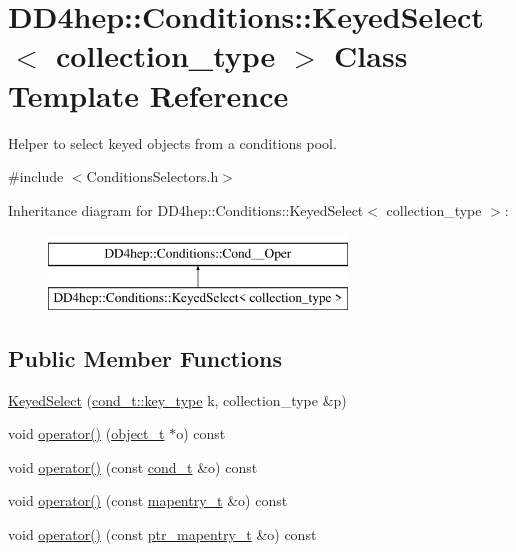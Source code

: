\hypertarget{class_d_d4hep_1_1_conditions_1_1_keyed_select}{}\section{D\+D4hep\+:\+:Conditions\+:\+:Keyed\+Select$<$ collection\+\_\+type $>$ Class Template Reference}
\label{class_d_d4hep_1_1_conditions_1_1_keyed_select}


Helper to select keyed objects from a conditions pool.  




{\ttfamily \#include $<$Conditions\+Selectors.\+h$>$}

Inheritance diagram for D\+D4hep\+:\+:Conditions\+:\+:Keyed\+Select$<$ collection\+\_\+type $>$\+:\begin{figure}[H]
\begin{center}
\leavevmode
\includegraphics[height=2.000000cm]{class_d_d4hep_1_1_conditions_1_1_keyed_select}
\end{center}
\end{figure}
\subsection*{Public Member Functions}
\begin{DoxyCompactItemize}
\item 
\hyperlink{class_d_d4hep_1_1_conditions_1_1_keyed_select_a4158acaaf6c6911619a41d39fe92d247}{Keyed\+Select} (\hyperlink{class_d_d4hep_1_1_conditions_1_1_condition_a7528efa762e8cc072ef80ea67c3531f9}{cond\+\_\+t\+::key\+\_\+type} k, collection\+\_\+type \&p)
\item 
void \hyperlink{class_d_d4hep_1_1_conditions_1_1_keyed_select_afd27ff9c2eb4d46c07ff631eb852da6b}{operator()} (\hyperlink{class_d_d4hep_1_1_conditions_1_1_cond_____oper_a4229491e49bfd21058dff10125a73f63}{object\+\_\+t} $\ast$o) const
\item 
void \hyperlink{class_d_d4hep_1_1_conditions_1_1_keyed_select_a2fb04380265c69a53a38b8b8e991a5f8}{operator()} (const \hyperlink{class_d_d4hep_1_1_conditions_1_1_cond_____oper_aceca9f6a0e8c84364946eace47275d09}{cond\+\_\+t} \&o) const
\item 
void \hyperlink{class_d_d4hep_1_1_conditions_1_1_keyed_select_a5127027cac0e941b11a10c2d434e7ac9}{operator()} (const \hyperlink{class_d_d4hep_1_1_conditions_1_1_cond_____oper_a877dac3da66795207aed15be219acbdc}{mapentry\+\_\+t} \&o) const
\item 
void \hyperlink{class_d_d4hep_1_1_conditions_1_1_keyed_select_a96f8e463757514984a4a3e312887a5b6}{operator()} (const \hyperlink{class_d_d4hep_1_1_conditions_1_1_cond_____oper_a0949e4bd5f90cd3fae2394cf30983973}{ptr\+\_\+mapentry\+\_\+t} \&o) const
\end{DoxyCompactItemize}
